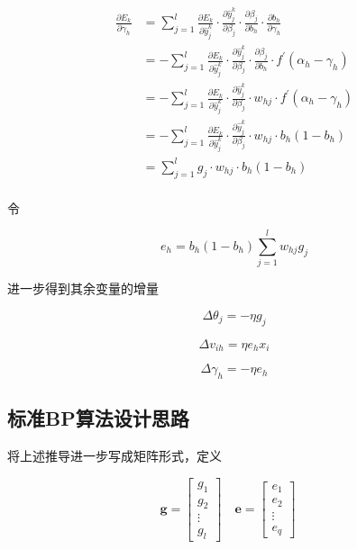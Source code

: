 \documentclass{ctexart}
\begin{document}
	\begin{equation}
		\begin{aligned}
			\frac{\partial E_{k}}{\partial \gamma_{h}} &=\sum_{j=1}^{l} \frac{\partial E_{k}}{\partial \hat{y}_{j}^{k}} \cdot \frac{\partial \hat{y}_{j}^{k}}{\partial \beta_{j}} \cdot \frac{\partial \beta_{j}}{\partial b_{h}} \cdot \frac{\partial b_{h}}{\partial \gamma_{h}} \\
			&=-\sum_{j=1}^{l} \frac{\partial E_{k}}{\partial \hat{y}_{j}^{k}} \cdot \frac{\partial \hat{y}_{j}^{k}}{\partial \beta_{j}} \cdot \frac{\partial \beta_{j}}{\partial b_{h}} \cdot f^{\prime}\left(\alpha_{h}-\gamma_{h}\right)\\
			&=-\sum_{j=1}^{l} \frac{\partial E_{k}}{\partial \hat{y}_{j}^{k}} \cdot \frac{\partial \hat{y}_{j}^{k}}{\partial \beta_{j}} \cdot w_{h j} \cdot f^{\prime}\left(\alpha_{h}-\gamma_{h}\right) \\
			&=-\sum_{j=1}^{l} \frac{\partial E_{k}}{\partial \hat{y}_{j}^{k}} \cdot \frac{\partial \hat{y}_{j}^{k}}{\partial \beta_{j}} \cdot w_{h j} \cdot b_{h}\left(1-b_{h}\right) \\
			&=\sum_{j=1}^{l} g_{j} \cdot w_{h j} \cdot b_{h}\left(1-b_{h}\right) \\
		\end{aligned}
	\end{equation}

	令
	
	\begin{equation}
		e_h=b_{h}\left(1-b_{h}\right) \sum_{j=1}^{l} w_{h j} g_{j}
	\end{equation}

	进一步得到其余变量的增量
	
	\begin{equation}
		\Delta\theta_{j}=-\eta g_j
	\end{equation}
	
	\begin{equation}
		\Delta v_{ih}=\eta e_h x_i
	\end{equation}

	\begin{equation}
		\Delta \gamma_h=-\eta e_h
	\end{equation}
	
	\subsection{标准BP算法设计思路}
	将上述推导进一步写成矩阵形式，定义
	
	\begin{equation}
		\bm{g}=\begin{bmatrix}
			g_1\\g_2\\\vdots\\g_l
		\end{bmatrix}\quad
		\bm{e}=\begin{bmatrix}
			e_1\\e_2\\\vdots\\e_q
		\end{bmatrix}\quad
	\end{equation}
\end{document}

